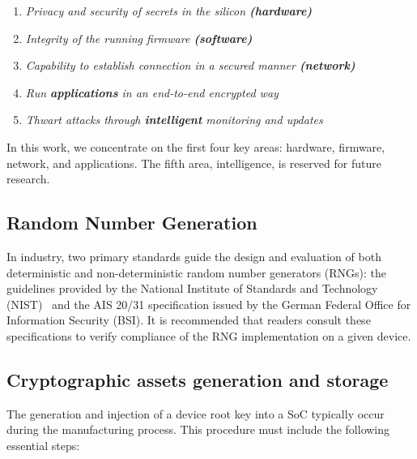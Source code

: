 \documentclass[pdflatex,sn-mathphys-num]{sn-jnl}%
\theoremstyle{thmstyleone}%
\theoremstyle{thmstyletwo}%
\theoremstyle{thmstylethree}%
\begin{document}
\begin{enumerate}

    \item \emph{Privacy and security of secrets in the  silicon \textbf{(hardware)}}    
    \item \emph{Integrity of the running firmware \textbf{(software)}}
    \item \emph{Capability to establish connection in a secured manner \textbf{(network)}}
    
    \item \emph{Run \textbf{applications}  in an end-to-end encrypted way }

    \item \emph{Thwart  attacks through \textbf{intelligent} monitoring and updates }

\end{enumerate}
In this work, we concentrate on the first four key areas: hardware, firmware, network, and applications. The fifth area, intelligence, is reserved for future research.




\subsection{  Random Number Generation}

In industry, two primary standards guide the design and evaluation of both deterministic and non-deterministic random number generators (RNGs): the guidelines provided by the National Institute of Standards and Technology (NIST)~\cite{nist80090a} and the AIS 20/31 specification issued by the German Federal Office for Information Security (BSI)\cite{BSI_RNG_2024}. It is recommended that readers consult these specifications to verify compliance of the RNG implementation on a given device.

\subsection{Cryptographic assets generation and storage }

The generation and injection of a device root key into a SoC typically occur during the manufacturing process. This procedure must include the following essential steps:
\end{document}
